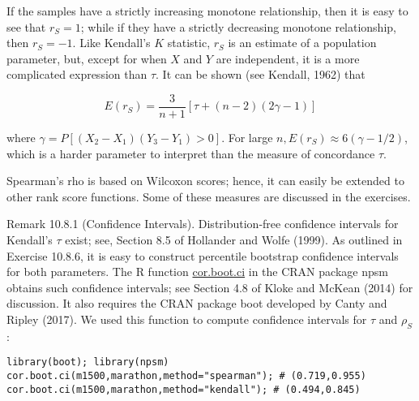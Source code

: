 If the samples have a strictly increasing monotone relationship, then it is easy to see that $r_{S}=1$; while if they have a strictly decreasing monotone relationship, then $r_{S}=-1$. Like Kendall's $K$ statistic, $r_{S}$ is an estimate of a population parameter, but, except for when $X$ and $Y$ are independent, it is a more complicated expression than $\tau$. It can be shown (see Kendall, 1962) that


\begin{equation*}
E\left(r_{S}\right)=\frac{3}{n+1}[\tau+(n-2)(2 \gamma-1)] \tag{10.8.15}
\end{equation*}


where $\gamma=P\left[\left(X_{2}-X_{1}\right)\left(Y_{3}-Y_{1}\right)>0\right]$. For large $n, E\left(r_{S}\right) \approx 6(\gamma-1 / 2)$, which is a harder parameter to interpret than the measure of concordance $\tau$.

Spearman's rho is based on Wilcoxon scores; hence, it can easily be extended to other rank score functions. Some of these measures are discussed in the exercises.

Remark 10.8.1 (Confidence Intervals). Distribution-free confidence intervals for Kendall's $\tau$ exist; see, Section 8.5 of Hollander and Wolfe (1999). As outlined in Exercise 10.8.6, it is easy to construct percentile bootstrap confidence intervals for both parameters. The R function \href{http://cor.boot.ci}{cor.boot.ci} in the CRAN package npsm obtains such confidence intervals; see Section 4.8 of Kloke and McKean (2014) for discussion. It also requires the CRAN package boot developed by Canty and Ripley (2017). We used this function to compute confidence intervals for $\tau$ and $\rho_{S}$ :

\begin{verbatim}
library(boot); library(npsm)
cor.boot.ci(m1500,marathon,method="spearman"); # (0.719,0.955)
cor.boot.ci(m1500,marathon,method="kendall"); # (0.494,0.845)
\end{verbatim}

